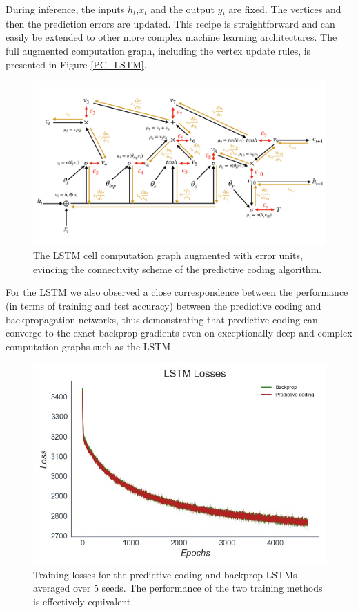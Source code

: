 During inference, the inputs $h_t$,$x_t$ and the output $y_t$ are fixed. The vertices and then the prediction errors are updated. This recipe is straightforward and can easily be extended to other more complex machine learning architectures. The full augmented computation graph, including the vertex update rules, is presented in Figure \ref{PC_LSTM}.


\begin{figure}%
  \centering
  \includegraphics[width=1\linewidth]{chapter_6_figures/pc_LSTM.pdf}  
\caption{The LSTM cell computation graph augmented with error units, evincing the connectivity scheme of the predictive coding algorithm.}
\label{pc_lstm}
\end{figure}

For the LSTM we also observed a close correspondence between the performance (in terms of training and test accuracy) between the predictive coding and backpropagation networks, thus demonstrating that predictive coding can converge to the exact backprop gradients even on exceptionally deep and complex computation graphs such as the LSTM

\begin{figure}[ht]
  \centering
  \includegraphics[width=0.7\linewidth]{chapter_6_figures/LSTM_Losses_super_prelim_6.jpg}  
\caption{Training losses for the predictive coding and backprop LSTMs averaged over 5 seeds. The performance of the two training methods is effectively equivalent.}
\label{LSTM_losses}
\end{figure}

